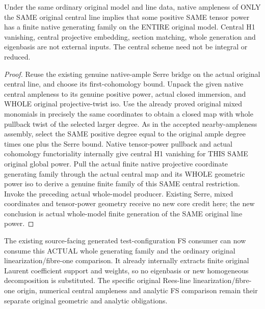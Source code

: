 \begin{theorem}
\label{thm:central-embedding-original-centralample-positivepower-whole-generators}
\leanok
Under the same ordinary original model and line data, native ampleness of
ONLY the SAME original central line implies that some positive SAME tensor
power has a finite native generating family on the ENTIRE original model.
Central H1 vanishing, central projective embedding, section matching, whole
generation and eigenbasis are not external inputs. The central scheme need
not be integral or reduced.
\end{theorem}
\begin{proof}
Reuse the existing genuine native-ample Serre bridge on the actual original
central line, and choose its first-cohomology bound. Unpack the given native
central ampleness to its genuine positive power, actual closed immersion,
and WHOLE original projective-twist iso. Use the already proved original
mixed monomials in precisely the same coordinates to obtain a closed map
with whole pullback twist of the selected larger degree. As in the accepted
nearby-ampleness assembly, select the SAME positive degree equal to the
original ample degree times one plus the Serre bound. Native tensor-power
pullback and actual cohomology functoriality internally give central H1
vanishing for THIS SAME original global power. Pull the actual finite native
projective coordinate generating family through the actual central map and
its WHOLE geometric power iso to derive a genuine finite family of this
SAME central restriction. Invoke the preceding actual whole-model producer.
Existing Serre, mixed coordinates and tensor-power geometry receive no new
core credit here; the new conclusion is actual whole-model finite generation
of the SAME original line power.
\end{proof}
The existing source-facing generated test-configuration FS consumer can now
consume this ACTUAL whole generating family and the ordinary original
linearization/fibre-one comparison. It already internally extracts finite
original Laurent coefficient support and weights, so no eigenbasis or new
homogeneous decomposition is substituted. The specific original Rees-line
linearization/fibre-one origin, numerical central ampleness and analytic FS
comparison remain their separate original geometric and analytic obligations.
